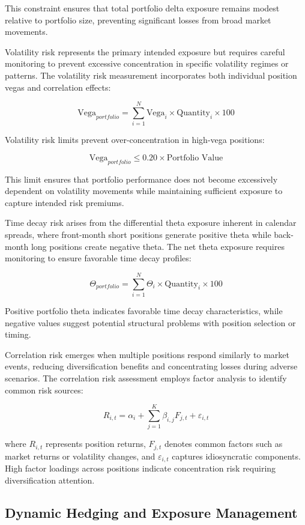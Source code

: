 \documentclass[
  american,
  11pt,
  11pt,
  letterpaper,
  onecolumn]{article}
\begin{document}
This constraint ensures that total portfolio delta exposure remains
modest relative to portfolio size, preventing significant losses from
broad market movements.

Volatility risk represents the primary intended exposure but requires
careful monitoring to prevent excessive concentration in specific
volatility regimes or patterns. The volatility risk measurement
incorporates both individual position vegas and correlation effects:

\[\text{Vega}_{portfolio} = \sum_{i=1}^{N} \text{Vega}_i \times \text{Quantity}_i \times 100\]

Volatility risk limits prevent over-concentration in high-vega
positions:

\[\text{Vega}_{portfolio} \leq 0.20 \times \text{Portfolio Value}\]

This limit ensures that portfolio performance does not become
excessively dependent on volatility movements while maintaining
sufficient exposure to capture intended risk premiums.

Time decay risk arises from the differential theta exposure inherent in
calendar spreads, where front-month short positions generate positive
theta while back-month long positions create negative theta. The net
theta exposure requires monitoring to ensure favorable time decay
profiles:

\[\Theta_{portfolio} = \sum_{i=1}^{N} \Theta_i \times \text{Quantity}_i \times 100\]

Positive portfolio theta indicates favorable time decay characteristics,
while negative values suggest potential structural problems with
position selection or timing.

Correlation risk emerges when multiple positions respond similarly to
market events, reducing diversification benefits and concentrating
losses during adverse scenarios. The correlation risk assessment employs
factor analysis to identify common risk sources:

\[R_{i,t} = \alpha_i + \sum_{j=1}^{K} \beta_{i,j} F_{j,t} + \varepsilon_{i,t}\]

where \(R_{i,t}\) represents position returns, \(F_{j,t}\) denotes
common factors such as market returns or volatility changes, and
\(\varepsilon_{i,t}\) captures idiosyncratic components. High factor
loadings across positions indicate concentration risk requiring
diversification attention.

\subsection{Dynamic Hedging and Exposure
Management}\label{dynamic-hedging-and-exposure-management}
\end{document}
